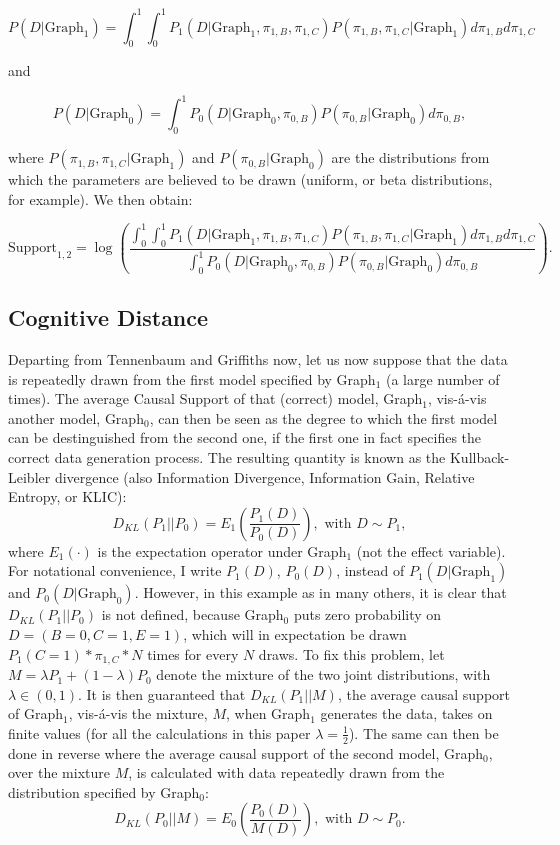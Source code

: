 \documentclass[12pt]{article}
\begin{document}
$$P(D | \text{Graph}_1)=\int_0^1 \int_0^1 P_1(D | \text{Graph}_1, \pi_{1, B}, \pi_{1, C})P(\pi_{1, B}, \pi_{1, C} | \text{Graph}_1) d\pi_{1, B} d\pi_{1, C}$$

and

$$P(D | \text{Graph}_0)=\int_0^1 P_0(D | \text{Graph}_0, \pi_{0,B}) P(\pi_{0, B} | \text{Graph}_0) d\pi_{0, B},$$

where $P(\pi_{1, B}, \pi_{1, C} | \text{Graph}_1)$ and $P(\pi_{0, B} | \text{Graph}_0)$ are the distributions from which the parameters are believed to be drawn (uniform, or beta distributions, for example). We then obtain:

$$\text{Support}_{1,2} = \log\left(\frac{\int_0^1 \int_0^1 P_1(D | \text{Graph}_1, \pi_{1, B}, \pi_{1, C})P(\pi_{1, B}, \pi_{1, C} | \text{Graph}_1) d\pi_{1, B} d\pi_{1, C}}{\int_0^1 P_0(D | \text{Graph}_0, \pi_{0,B}) P(\pi_{0, B} | \text{Graph}_0) d\pi_{0, B}}\right).$$

\subsection{Cognitive Distance}

Departing from Tennenbaum and Griffiths now, let us now suppose that the data is repeatedly drawn from the first model specified by Graph$_1$ (a large number of times). The average Causal Support of that (correct) model, Graph$_1$, vis-\'a-vis another model, Graph$_0$, can then be seen as the degree to which the first model can be destinguished from the second one, if the first one in fact specifies the correct data generation process. The resulting quantity is known as the Kullback-Leibler divergence  (also Information Divergence, Information Gain, Relative Entropy, or KLIC):
$$D_{KL}(P_1 | | P_0)=E_1\left(\frac{P_1(D)}{P_0(D)}\right), \text{ with } D\sim P_1,$$
where $E_1(\cdot)$ is the expectation operator under Graph$_1$ (not the effect variable). For notational convenience, I write $P_1(D)$, $P_0(D)$, instead of $P_1(D | \text{Graph}_1)$ and $P_0(D | \text{Graph}_0)$. However, in this example as in many others, it is clear that $D_{KL}(P_1 | | P_0)$ is not defined, because Graph$_0$ puts zero probability on $D=(B=0, C=1, E=1)$, which will in expectation be drawn $P_1(C=1)*\pi_{1, C}*N$ times for every $N$ draws. To fix this problem, let $M=\lambda P_1 + (1-\lambda) P_0$ denote the mixture of the two joint distributions, with $\lambda \in (0, 1)$. It is then guaranteed that $D_{KL}(P_1 | | M)$, the average causal support of Graph$_1$, vis-\'a-vis the mixture, $M$, when Graph$_1$ generates the data, takes on finite values (for all the calculations in this paper $\lambda =\frac{1}{2}$). The same can then be done in reverse where the average causal support of the second model, Graph$_0$, over the mixture $M$, is calculated with data repeatedly drawn from the distribution specified by Graph$_0$:
$$D_{KL}(P_0 | | M)=E_0\left(\frac{P_0(D)}{M(D)}\right), \text{ with } D\sim P_0.$$
\end{document}
